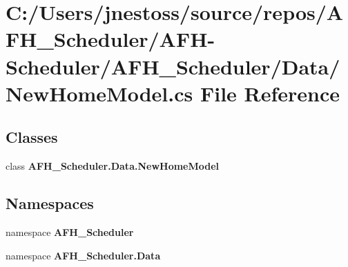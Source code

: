 \section{C\+:/\+Users/jnestoss/source/repos/\+A\+F\+H\+\_\+\+Scheduler/\+A\+F\+H-\/\+Scheduler/\+A\+F\+H\+\_\+\+Scheduler/\+Data/\+New\+Home\+Model.cs File Reference}
\label{_new_home_model_8cs}
\subsection*{Classes}
\begin{DoxyCompactItemize}
\item 
class \textbf{ A\+F\+H\+\_\+\+Scheduler.\+Data.\+New\+Home\+Model}
\end{DoxyCompactItemize}
\subsection*{Namespaces}
\begin{DoxyCompactItemize}
\item 
namespace \textbf{ A\+F\+H\+\_\+\+Scheduler}
\item 
namespace \textbf{ A\+F\+H\+\_\+\+Scheduler.\+Data}
\end{DoxyCompactItemize}
